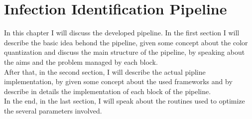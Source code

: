 \documentclass{standalone}
\begin{document}
	\chapter{Infection Identification Pipeline}
	
	
	In this chapter I will discuss the developed pipeline. In the first section I will describe the basic idea behond the pipeline, given some concept about the color quantization and discuss the main structure of the pipeline, by speaking about the aims and the problem managed by each block.\\
	After that, in the second section, I will describe the actual pipline implementation, by given some concept about the used frameworks and by describe in details the implementation of each block of the pipeline.\\
	In the end, in the last section, I will speak about the routines used to optimize the several parameters involved.\\
	
	
\end{document}
